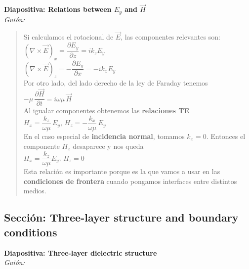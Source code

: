 \documentclass{article}
\begin{document}
\vspace{0.4cm}

\noindent
\textbf{Diapositiva: Relations between \(E_y\) and \(\vec H\)}\\[2mm]
\textit{Guión:}\\[2mm]

\begin{quote}
Si calculamos el rotacional de \(\vec{E}\), las componentes relevantes son:\\[1mm]
\((\nabla\times\vec{E})_x = \dfrac{\partial E_y}{\partial z} = i k_z E_y\)\\
\((\nabla\times\vec{E})_z = -\dfrac{\partial E_y}{\partial x} = -i k_x E_y\)\\[2mm]
Por otro lado, del lado derecho de la ley de Faraday tenemos\\[1mm]
\(-\mu\,\dfrac{\partial \vec{H}}{\partial t} = i\omega\mu\,\vec{H}\)\\[2mm]
Al igualar componentes obtenemos las \textbf{relaciones TE}\\[1mm]
\(H_x = \dfrac{k_z}{\omega\mu}\,E_y\), \qquad
\(H_z = -\dfrac{k_x}{\omega\mu}\,E_y\)\\[2mm]
En el caso especial de \textbf{incidencia normal}, tomamos \(k_x = 0\). Entonces el componente 
\(H_z\) desaparece y nos queda\\[1mm]
\(H_x = \dfrac{k_z}{\omega\mu} E_y\), \quad \(H_z = 0\)\\[2mm]
Esta relación es importante porque es la que vamos a usar en las \textbf{condiciones de frontera} 
cuando pongamos interfaces entre distintos medios.
\end{quote}

\vspace{0.8cm}

\subsection*{Sección: Three-layer structure and boundary conditions}

\noindent
\textbf{Diapositiva: Three-layer dielectric structure}\\[2mm]
\textit{Guión:}\\[2mm]
\end{document}
